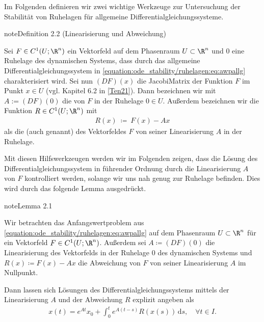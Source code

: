 \documentclass[letterpaper,10pt,english]{jupyterBook}
\begin{document}
\sphinxAtStartPar
Im Folgenden definieren wir zwei wichtige Werkzeuge zur Untersuchung der Stabilität von Ruhelagen für allgemeine Differentialgleichungssysteme.
\label{ode_stability/ruhelagen:def:linearisierung}
\begin{sphinxadmonition}{note}{Definition 2.2 (Linearisierung und Abweichung)}



\sphinxAtStartPar
Sei \(F\in C^1(U;\R^n)\) ein Vektorfeld auf dem Phasenraum \(U \subset \R^n\) und \(0\) eine Ruhelage des dynamischen Systems, dass durch das allgemeine Differentialgleichungssystem in \eqref{equation:ode_stability/ruhelagen:eq:awpallg} charakterisiert wird.
Sei nun \((DF)(x)\) die Jacobi\sphinxhyphen{}Matrix der Funktion \(F\) im Punkt \(x \in U\) (vgl. Kapitel 6.2 in {[}\hyperlink{cite.references:id12}{Ten21}{]}).
Dann bezeichnen wir mit \(A := (DF)(0)\) die  von \(F\) in der Ruhelage \(0 \in U\).
Außerdem bezeichnen wir die Funktion \(R \in C^1(U; \R^n)\) mit
\begin{equation*}
\begin{split}R(x) \ \coloneqq \ F(x) - Ax\end{split}
\end{equation*}
\sphinxAtStartPar
als die  (auch  genannt) des Vektorfeldes \(F\) von seiner Linearisierung \(A\) in der Ruhelage.
\end{sphinxadmonition}

\sphinxAtStartPar
Mit diesen Hilfswerkzeugen werden wir im Folgenden zeigen, dass die Lösung des Differentialgleichungssystem in führender Ordnung durch die Linearisierung \(A\) von \(F\) kontrolliert werden, solange wir uns nah genug zur Ruhelage befinden. Dies wird durch das folgende Lemma ausgedrückt.
\label{ode_stability/ruhelagen:lem:intexpglgn}
\begin{sphinxadmonition}{note}{Lemma 2.1}



\sphinxAtStartPar
Wir betrachten das Anfangswertproblem aus \eqref{equation:ode_stability/ruhelagen:eq:awpallg} auf dem Phasenraum \(U \subset \R^n\) für ein Vektorfeld \(F\in C^1(U;\R^n)\).
Außerdem sei \(A \coloneqq (DF)(0)\) die Linearisierung des Vektorfelds in der Ruhelage \(0\) des dynamischen Systems und \(R(x) \coloneqq F(x) - Ax\) die Abweichung von \(F\) von seiner Linearisierung \(A\) im Nullpunkt.

\sphinxAtStartPar
Dann lassen sich Lösungen des Differentialgleichungssystems mittels der Linearisierung \(A\) und der Abweichung \(R\) explizit angeben als
\begin{equation*}
\begin{split}x(t) = e^{At}x_0 + \int_0^t e^{A(t-s)} R(x(s))\, \mathrm{d}s, \quad \forall t \in I.\end{split}
\end{equation*}\end{sphinxadmonition}
\end{document}
